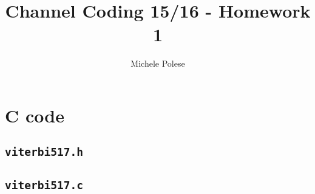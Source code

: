 \documentclass[10pt]{article}
\numberwithin{equation}{section}
\begin{document}
\title{Channel Coding 15/16 - Homework 1}
\author{Michele Polese}

\maketitle

\section*{C code}
\subsection*{\texttt{viterbi517.h}}

\subsection*{\texttt{viterbi517.c}}

\end{document}
